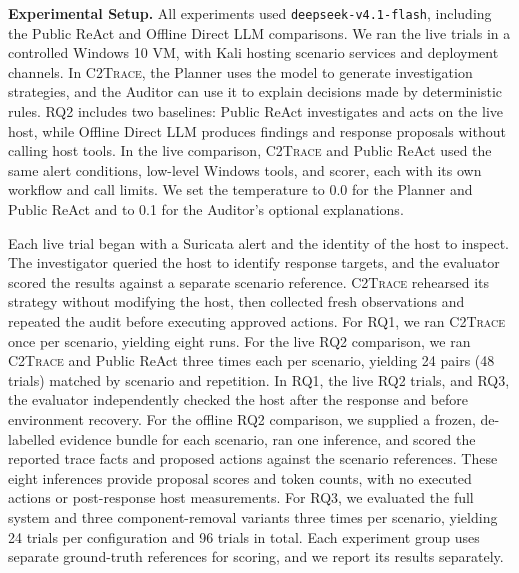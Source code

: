 \documentclass[pdflatex,sn-basic]{sn-jnl}
\newcommand{\system}{\textsc{C2Trace}\xspace}
\begin{document}
\noindent\textbf{Experimental Setup.} All experiments used \texttt{deepseek-v4.1-flash}, including the Public ReAct and Offline Direct LLM comparisons. We ran the live trials in a controlled Windows 10 VM, with Kali hosting scenario services and deployment channels. In \system, the Planner uses the model to generate investigation strategies, and the Auditor can use it to explain decisions made by deterministic rules. RQ2 includes two baselines: Public ReAct investigates and acts on the live host, while Offline Direct LLM produces findings and response proposals without calling host tools. In the live comparison, \system and Public ReAct used the same alert conditions, low-level Windows tools, and scorer, each with its own workflow and call limits. We set the temperature to 0.0 for the Planner and Public ReAct and to 0.1 for the Auditor's optional explanations.

Each live trial began with a Suricata alert and the identity of the host to inspect. The investigator queried the host to identify response targets, and the evaluator scored the results against a separate scenario reference. \system rehearsed its strategy without modifying the host, then collected fresh observations and repeated the audit before executing approved actions. For RQ1, we ran \system once per scenario, yielding eight runs. For the live RQ2 comparison, we ran \system and Public ReAct three times each per scenario, yielding 24 pairs (48 trials) matched by scenario and repetition. In RQ1, the live RQ2 trials, and RQ3, the evaluator independently checked the host after the response and before environment recovery. For the offline RQ2 comparison, we supplied a frozen, de-labelled evidence bundle for each scenario, ran one inference, and scored the reported trace facts and proposed actions against the scenario references. These eight inferences provide proposal scores and token counts, with no executed actions or post-response host measurements. For RQ3, we evaluated the full system and three component-removal variants three times per scenario, yielding 24 trials per configuration and 96 trials in total. Each experiment group uses separate ground-truth references for scoring, and we report its results separately.
\end{document}
